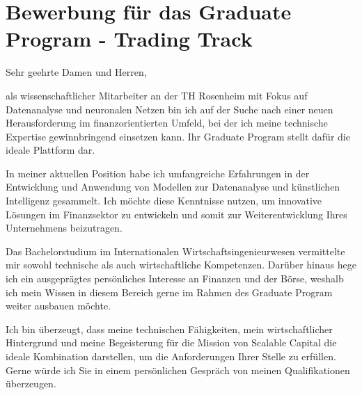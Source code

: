 \section*{Bewerbung für das Graduate Program - Trading Track}
Sehr geehrte Damen und Herren,

als wissenschaftlicher Mitarbeiter an der TH Rosenheim mit Fokus auf Datenanalyse und neuronalen Netzen bin ich auf der Suche nach einer neuen Herausforderung im finanzorientierten Umfeld, bei der ich meine technische Expertise gewinnbringend einsetzen kann. Ihr Graduate Program stellt dafür die ideale Plattform dar.

In meiner aktuellen Position habe ich umfangreiche Erfahrungen in der Entwicklung und Anwendung von Modellen zur Datenanalyse und künstlichen Intelligenz gesammelt. Ich möchte diese Kenntnisse nutzen, um innovative Lösungen im Finanzsektor zu entwickeln und somit zur Weiterentwicklung Ihres Unternehmens beizutragen.

Das Bachelorstudium im Internationalen Wirtschaftsingenieurwesen vermittelte mir sowohl technische als auch wirtschaftliche Kompetenzen. Darüber hinaus hege ich ein ausgeprägtes persönliches Interesse an Finanzen und der Börse, weshalb ich mein Wissen in diesem Bereich gerne im Rahmen des Graduate Program weiter ausbauen möchte.

Ich bin überzeugt, dass meine technischen Fähigkeiten, mein wirtschaftlicher Hintergrund und meine Begeisterung für die Mission von Scalable Capital die ideale Kombination darstellen, um die Anforderungen Ihrer Stelle zu erfüllen. Gerne würde ich Sie in einem persönlichen Gespräch von meinen Qualifikationen überzeugen.
